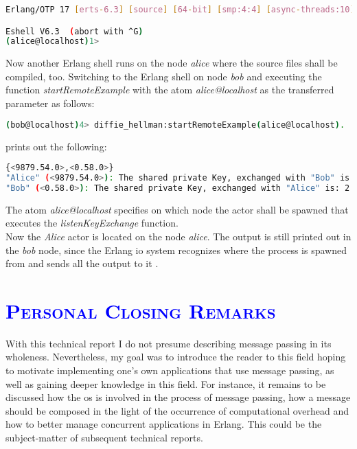 \documentclass[xcolor=dvipsnames]{article}
\begin{document}
\begin{lstlisting}[language=bash]
Erlang/OTP 17 [erts-6.3] [source] [64-bit] [smp:4:4] [async-threads:10] [hipe] [kernel-poll:false]

Eshell V6.3  (abort with ^G)
(alice@localhost)1>
\end{lstlisting}

\noindent Now another Erlang shell runs on the node \textit{alice} where the source files shall be compiled, too. Switching to the Erlang shell on node \textit{bob} and executing the function \textit{startRemoteExample} with the atom \textit{alice@localhost} as the transferred parameter as follows:

\begin{lstlisting}[language=bash]
(bob@localhost)4> diffie_hellman:startRemoteExample(alice@localhost).
\end{lstlisting}

\noindent prints out the following:

\begin{lstlisting}[language=bash]
{<9879.54.0>,<0.58.0>}
"Alice" (<9879.54.0>): The shared private Key, exchanged with "Bob" is: 2
"Bob" (<0.58.0>): The shared private Key, exchanged with "Alice" is: 2
\end{lstlisting}

\noindent The atom \textit{alice@localhost} specifies on which node the actor shall be spawned that executes the \textit{listenKeyExchange} function.\\

\noindent Now the \textit{Alice} actor is located on the node \textit{alice}. The output is still printed out in the \textit{bob} node, since the Erlang io system recognizes where the process is spawned from and sends all the output to it \cite[ch. 4.3.4 on p. 104]{erl_doc}.

\section{\scshape{\textcolor{blue}{Personal Closing Remarks}}}

\noindent With this technical report I do not presume describing message passing in its wholeness. Nevertheless, my goal was to introduce the reader to this field hoping to motivate implementing one's own applications that use message passing, as well as gaining deeper knowledge in this field. For instance, it remains to be discussed how the \gls{os} is involved in the process of message passing, how a message should be composed in the light of the occurrence of computational overhead and how to better manage concurrent applications in Erlang. This could be the subject-matter of subsequent technical reports.
\end{document}

